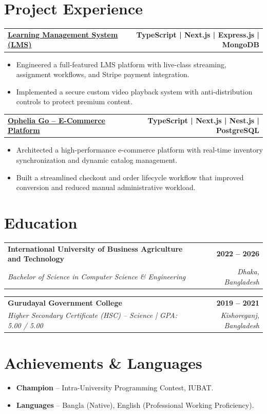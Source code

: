 \documentclass[letterpaper,11pt]{article}
\makeatletter
\newcommand{\resumeSubheading}[4]{%
  \vspace{1.5pt}
  \begin{tabularx}{\linewidth}{@{}X r@{}}
    \textbf{#1} & \textbf{#2} \\
    \textit{#3} & \textit{#4}
  \end{tabularx}
  \vspace{1pt}
}
\newcommand{\resumeItem}[1]{\item #1}
\newcommand{\projectHeading}[3]{%
  \vspace{1.5pt}
  \begin{tabularx}{\linewidth}{@{}X r@{}}
    \textbf{\href{#2}{#1}} & \textbf{#3}
  \end{tabularx}
}
\newenvironment{resumeItemList}{%
  \begin{itemize}[leftmargin=0.19in, label=\textbullet, itemsep=2pt, topsep=2pt, parsep=0pt]
}{%
  \end{itemize}
}
\makeatother
\begin{document}
\section{Project Experience}

\projectHeading{Learning Management System (LMS)}{https://www.learnwithjewel.xyz/}{TypeScript | Next.js | Express.js | MongoDB}
\begin{resumeItemList}
  \resumeItem{Engineered a full-featured LMS platform with live-class streaming, assignment workflows, and Stripe payment integration.}
  \resumeItem{Implemented a secure custom video playback system with anti-distribution controls to protect premium content.}
\end{resumeItemList}

\projectHeading{Ophelia Go -- E-Commerce Platform}{https://www.learnwithjewel.xyz/}{TypeScript | Next.js | Nest.js | PostgreSQL}
\begin{resumeItemList}
  \resumeItem{Architected a high-performance e-commerce platform with real-time inventory synchronization and dynamic catalog management.}
  \resumeItem{Built a streamlined checkout and order lifecycle workflow that improved conversion and reduced manual administrative workload.}
\end{resumeItemList}

\section{Education}

\resumeSubheading
  {International University of Business Agriculture and Technology}{2022 -- 2026}
  {Bachelor of Science in Computer Science \& Engineering}{Dhaka, Bangladesh}

\resumeSubheading
  {Gurudayal Government College}{2019 -- 2021}
  {Higher Secondary Certificate (HSC) -- Science | GPA: 5.00 / 5.00}{Kishoreganj, Bangladesh}

\section{Achievements \& Languages}
\begin{itemize}[leftmargin=0.19in, itemsep=1.5pt, topsep=1pt]
  \item \textbf{Champion} -- Intra-University Programming Contest, IUBAT.
  \item \textbf{Languages} -- Bangla (Native), English (Professional Working Proficiency).
\end{itemize}
\end{document}
